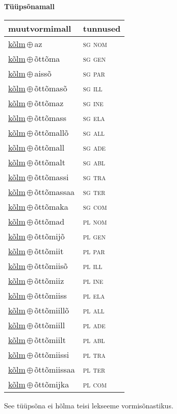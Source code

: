 

\vspace{3.5em}
\noindent \begin{minipage}{\textwidth}
\noindent \textbf{Tüüpsõnamall \,}\\

\begin{sideways}
\begin{tabular}{l l}
muutvormimall & tunnused \\
\hline
\underline{kõlm}\,$\oplus$\,az & \textsc{ sg nom } \\
\underline{kõlm}\,$\oplus$\,õttõma & \textsc{ sg gen } \\
\underline{kõlm}\,$\oplus$\,aissõ & \textsc{ sg par } \\
\underline{kõlm}\,$\oplus$\,õttõmasõ & \textsc{ sg ill } \\
\underline{kõlm}\,$\oplus$\,õttõmaz & \textsc{ sg ine } \\
\underline{kõlm}\,$\oplus$\,õttõmass & \textsc{ sg ela } \\
\underline{kõlm}\,$\oplus$\,õttõmallõ & \textsc{ sg all } \\
\underline{kõlm}\,$\oplus$\,õttõmall & \textsc{ sg ade } \\
\underline{kõlm}\,$\oplus$\,õttõmalt & \textsc{ sg abl } \\
\underline{kõlm}\,$\oplus$\,õttõmassi & \textsc{ sg tra } \\
\underline{kõlm}\,$\oplus$\,õttõmassaa & \textsc{ sg ter } \\
\underline{kõlm}\,$\oplus$\,õttõmaka & \textsc{ sg com } \\
\underline{kõlm}\,$\oplus$\,õttõmad & \textsc{ pl nom } \\
\underline{kõlm}\,$\oplus$\,õttõmijõ & \textsc{ pl gen } \\
\underline{kõlm}\,$\oplus$\,õttõmiit & \textsc{ pl par } \\
\underline{kõlm}\,$\oplus$\,õttõmiisõ & \textsc{ pl ill } \\
\underline{kõlm}\,$\oplus$\,õttõmiiz & \textsc{ pl ine } \\
\underline{kõlm}\,$\oplus$\,õttõmiiss & \textsc{ pl ela } \\
\underline{kõlm}\,$\oplus$\,õttõmiillõ & \textsc{ pl all } \\
\underline{kõlm}\,$\oplus$\,õttõmiill & \textsc{ pl ade } \\
\underline{kõlm}\,$\oplus$\,õttõmiilt & \textsc{ pl abl } \\
\underline{kõlm}\,$\oplus$\,õttõmiissi & \textsc{ pl tra } \\
\underline{kõlm}\,$\oplus$\,õttõmiissaa & \textsc{ pl ter } \\
\underline{kõlm}\,$\oplus$\,õttõmijka & \textsc{ pl com } \\
\end{tabular}
\end{sideways}
\label{tab:tüüpsõnamall-kõlmaz}

\end{minipage}

 
\vspace{1em}
\noindent See tüüpsõna ei hõlma teisi lekseeme vormi\-sõnastikus.
